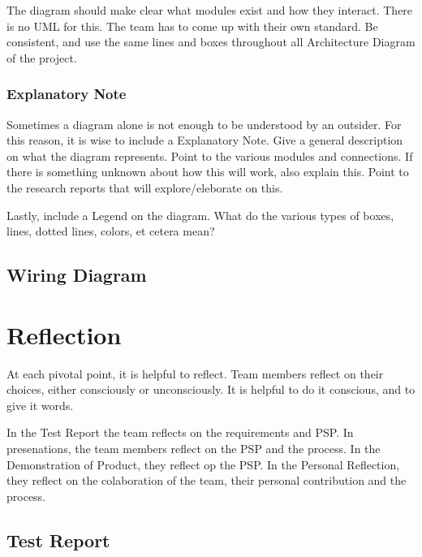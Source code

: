 \documentclass[10pt]{report}
\begin{document}
The diagram should make clear what modules exist and how they interact. There is no UML for this. The team has to come up with their own standard. Be consistent, and use the same lines and boxes throughout all Architecture Diagram of the project.

\subsection{Explanatory Note}

Sometimes a diagram alone is not enough to be understood by an outsider. For this reason, it is wise to include a Explanatory Note. Give a general description on what the diagram represents. Point to the various modules and connections. If there is something unknown about how this will work, also explain this. Point to the research reports that will explore/eleborate on this.

Lastly, include a Legend on the diagram. What do the various types of boxes, lines, dotted lines, colors, et cetera mean?

\newpage

\section{Wiring Diagram}



\newpage

\chapter{Reflection}
\thispagestyle{fancy}

At each pivotal point, it is helpful to reflect. Team members reflect on their choices, either consciously or unconsciously. It is helpful to do it conscious, and to give it words.

In the Test Report the team reflects on the requirements and PSP. In presenations, the team members reflect on the PSP and the process. In the Demonstration of Product, they reflect op the PSP. In the Personal Reflection, they reflect on the colaboration of the team, their personal contribution and the process.

\medskip
\minitoc

\newpage

\section{Test Report}
\end{document}
